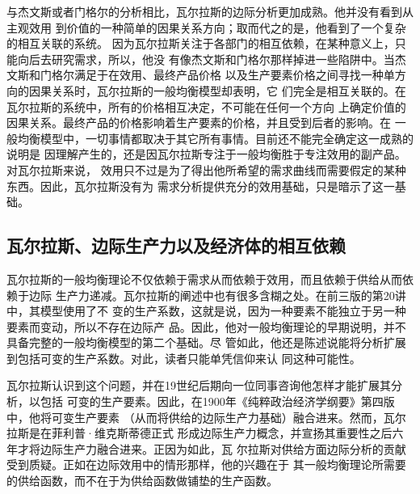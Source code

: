 与杰文斯或者门格尔的分析相比，瓦尔拉斯的边际分析更加成熟。他并没有看到从主观效用
到价值的一种简单的因果关系方向；取而代之的是，他看到了一个复杂的相互关联的系统。
因为瓦尔拉斯关注于各部门的相互依赖，在某种意义上，只能向后去研究需求，所以，他没
有像杰文斯和门格尔那样掉进一些陷阱中。当杰文斯和门格尔满足于在效用、最终产品价格
以及生产要素价格之间寻找一种单方向的因果关系时，瓦尔拉斯的一般均衡模型却表明，它
们完全是相互关联的。在瓦尔拉斯的系统中，所有的价格相互决定，不可能在任何一个方向
上确定价值的因果关系。最终产品的价格影响着生产要素的价格，并且受到后者的影响。在
一般均衡模型中，一切事情都取决于其它所有事情。目前还不能完全确定这一成熟的说明是
因理解产生的，还是因瓦尔拉斯专注于一般均衡胜于专注效用的副产品。对瓦尔拉斯来说，
效用只不过是为了得出他所希望的需求曲线而需要假定的某种东西。因此，瓦尔拉斯没有为
需求分析提供充分的效用基础，只是暗示了这一基础。

\subsection{瓦尔拉斯、边际生产力以及经济体的相互依赖}

瓦尔拉斯的一般均衡理论不仅依赖于需求从而依赖于效用，而且依赖于供给从而依赖于边际
生产力递减。瓦尔拉斯的阐述中也有很多含糊之处。在前三版的第20讲中，其模型使用了不
变的生产系数，这就是说，因为一种要素不能独立于另一种要素而变动，所以不存在边际产
品。因此，他对一般均衡理论的早期说明，并不具备完整的一般均衡模型的第二个基础。尽
管如此，他还是陈述说能将分析扩展到包括可变的生产系数。对此，读者只能单凭信仰来认
同这种可能性。

瓦尔拉斯认识到这个问题，并在19世纪后期向一位同事咨询他怎样才能扩展其分析，以包括
可变的生产要素。因此，在1900年《纯粹政治经济学纲要》第四版中，他将可变生产要素
（从而将供给的边际生产力基础）融合进来。然而，瓦尔拉斯是在菲利普·维克斯蒂德正式
形成边际生产力概念，并宣扬其重要性之后六年才将边际生产力融合进来。正因为如此，瓦
尔拉斯对供给方面边际分析的贡献受到质疑。正如在边际效用中的情形那样，他的兴趣在于
其一般均衡理论所需要的供给函数，而不在于为供给函数做铺垫的生产函数。

